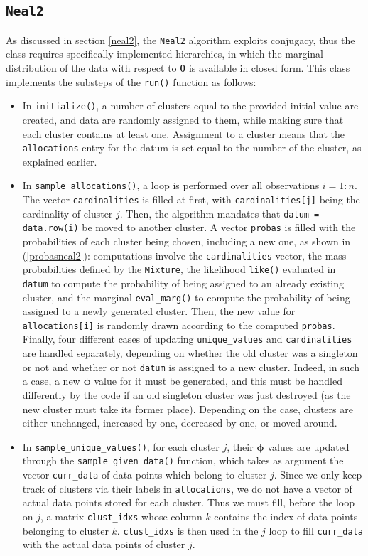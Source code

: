 \subsection{\texttt{Neal2}}
As discussed in section \ref{neal2}, the \verb|Neal2| algorithm exploits conjugacy, thus the class requires specifically implemented hierarchies, in which the marginal distribution of the data with respect to $\boldsymbol\theta$ is available in closed form.
This class implements the substeps of the \verb|run()| function as follows:
\begin{itemize}
	\item In \verb|initialize()|, a number of clusters equal to the provided initial value are created, and data are randomly assigned to them, while making sure that each cluster contains at least one.
	Assignment to a cluster means that the \verb|allocations| entry for the datum is set equal to the number of the cluster, as explained earlier.
	\item In \verb|sample_allocations()|, a loop is performed over all observations $i=1:n$.
	The vector \verb|cardinalities| is filled at first, with \verb|cardinalities[j]| being the cardinality of cluster $j$.
	Then, the algorithm mandates that \verb|datum = data.row(i)| be moved to another cluster.
	A vector \verb|probas| is filled with the probabilities of each cluster being chosen, including a new one, as shown in (\ref{probasneal2}): computations involve the \verb|cardinalities| vector, the mass probabilities defined by the \verb|Mixture|, the likelihood \verb|like()| evaluated in \verb|datum| to compute the probability of being assigned to an already existing cluster, and the marginal \verb|eval_marg()| to compute the probability of being assigned to a newly generated cluster.
	Then, the new value for \verb|allocations[i]| is randomly drawn according to the computed \verb|probas|.
	Finally, four different cases of updating \verb|unique_values| and \verb|cardinalities| are handled separately, depending on whether the old cluster was a singleton or not and whether or not \verb|datum| is assigned to a new cluster.
	Indeed, in such a case, a new $\boldsymbol\phi$ value for it must be generated, and this must be handled differently by the code if an old singleton cluster was just destroyed (as the new cluster must take its former place).
	Depending on the case, clusters are either unchanged, increased by one, decreased by one, or moved around.
	\item In \verb|sample_unique_values()|, for each cluster $j$, their $\boldsymbol\phi$ values are updated through the \verb|sample_given_data()| function, which takes as argument the vector \verb|curr_data| of data points which belong to cluster $j$.
	Since we only keep track of clusters via their labels in \verb|allocations|, we do not have a vector of actual data points stored for each cluster.
	Thus we must fill, before the loop on $j$, a matrix \verb|clust_idxs| whose column $k$ contains the index of data points belonging to cluster $k$.
	\verb|clust_idxs| is then used in the $j$ loop to fill \verb|curr_data| with the actual data points of cluster $j$.
\end{itemize}


